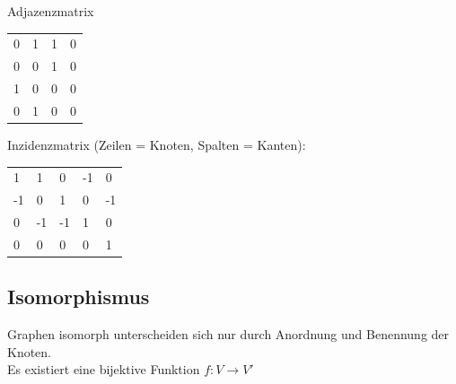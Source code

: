 \documentclass[8pt,landscape]{scrartcl}
\begin{document}
\begin{multicols}{3}
Adjazenzmatrix\\
\begin{tabular}{llll}
0 & 1 & 1 & 0\\
0 & 0 & 1 & 0\\
1 & 0 & 0 & 0\\
0 & 1 & 0 & 0
\end{tabular}


Inzidenzmatrix (Zeilen = Knoten, Spalten = Kanten):\\
\begin{tabular}{lllll}
1 & 1 & 0 & -1 & 0\\
-1 & 0 & 1 & 0 & -1\\
0 & -1 & -1 & 1 & 0\\
0 & 0 & 0 & 0 & 1
\end{tabular}

\subsection{Isomorphismus}
Graphen isomorph unterscheiden sich nur durch Anordnung und Benennung der Knoten.\\
Es existiert eine bijektive Funktion $f: V \rightarrow V'$




\end{multicols}
\end{document}
